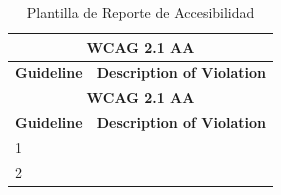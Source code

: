 \documentclass[stu, 12pt, letterpaper, donotrepeattitle, floatsintext, natbib]{apa7}
\begin{document}
\begin{longtable}{|p{3cm}|p{10cm}|}
    \caption{Plantilla de Reporte de Accesibilidad} \label{tab:reporte_accesibilidad} \\
    \hline
    \multicolumn{2}{|c|}{\textbf{WCAG 2.1 AA}} \\ \hline
    \textbf{Guideline} & \textbf{Description of Violation} \\ \hline
    \endfirsthead

    \hline
    \multicolumn{2}{|c|}{\textbf{WCAG 2.1 AA}} \\ \hline
    \textbf{Guideline} & \textbf{Description of Violation} \\ \hline
    \endhead

    1 &  \\ \hline
    2 &  \\ \hline
\end{longtable}
\end{document}
